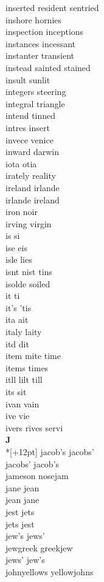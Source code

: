 inserted resident sentried\\
inshore hornies\\
inspection inceptions\\
instances incessant\\
instanter transient\\
instead sainted stained\\
insult sunlit\\
integers steering\\
integral triangle\\
intend tinned\\
intres insert\\
invece venice\\
inward darwin\\
iota otia\\
irately reality\\
ireland irlande\\
irlande ireland\\
iron noir\\
irving virgin\\
is si\\
ise eis\\
isle lies\\
isnt nist tins\\
isolde soiled\\
it ti\\
it's 'tis\\
ita ait\\
italy laity\\
itd dit\\
item mite time\\
items times\\
itll lilt till\\
its sit\\
ivan vain\\
ive vie\\
ivers rives servi\\

\vspace{14pt}
\noindent\textbf{\Large J}\\*[+12pt]
jacob's jacobs'\\
jacobs' jacob's\\
jameson nosejam\\
jane jean\\
jean jane\\
jest jets\\
jets jest\\
jew's jews'\\
jewgreek greekjew\\
jews' jew's\\
johnyellows yellowjohns\\

